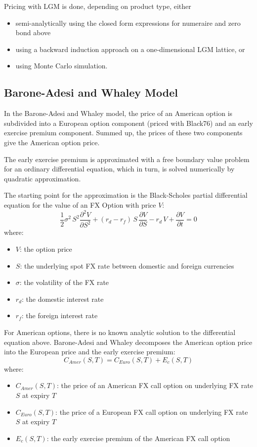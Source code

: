 \medskip
Pricing with LGM is done, depending on product type, either
\begin{itemize}
\item semi-analytically using the closed form expressions for numeraire and 
zero bond above
\item using a backward induction approach on a one-dimensional 
LGM lattice, or
\item using Monte Carlo simulation.
\end{itemize}

\subsection{Barone-Adesi and Whaley Model}
\label{models:barone-adesi}

In the Barone-Adesi and Whaley model, the price of an American option is subdivided 
into a European option component (priced with Black76) and an early exercise premium 
component. Summed up, the prices of these two components give the American option price.   

The early exercise premium is approximated with a free boundary value problem for an 
ordinary differential equation, which in turn, is solved numerically by quadratic 
approximation. 

The starting point for the approximation is the Black-Scholes partial differential 
equation for the value of an FX Option with price $V$:
$$
\frac{1}{2} \sigma^2\, S^2 \frac{\partial^2 V}{\partial S^2} + 
(r_d -r_f)\, S\, \frac{\partial V}{\partial S} - r_d\, V
+\frac{\partial V}{\partial t} = 0
$$
where:
\begin{itemize}
\item $V$: the option price
\item $S$: the underlying spot FX rate between domestic and foreign currencies
\item $\sigma$: the volatility of the FX rate
\item $r_d$: the domestic interest rate
\item $r_f$: the foreign interest rate
\end{itemize}

For American options, there is no known analytic solution to the differential equation 
above. Barone-Adesi and Whaley decomposes the American option price into the European 
price and the early exercise premium:
$$
C_{Amer} (S,T)= C_{Euro} (S,T) + E_c (S,T)
$$
where:
\begin{itemize}
\item $C_{Amer} (S,T)$: the price of an American FX call option on underlying FX 
rate $S$ at expiry $T$
\item $C_{Euro} (S,T)$: the price of a European FX call option on underlying FX 
rate $S$ at expiry $T$
\item $E_c (S,T)$: the early exercise premium of the American FX call option
\end{itemize}

